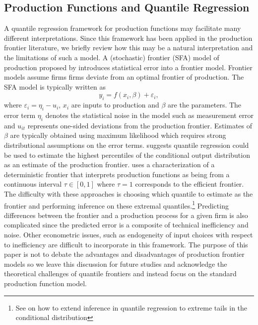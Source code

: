 \documentclass[11pt]{article}
\begin{document}
\subsection{Production Functions and Quantile Regression}


A quantile regression framework for production functions may facilitate many different interpretations. Since this framework has been applied in the production frontier literature, we briefly review how this may be a natural interpretation and the limitations of such a model. A (stochastic) frontier (SFA) model of production proposed by \cite{Aigner1977} introduces statistical error into a frontier model. Frontier models assume firms firms deviate from an optimal frontier of production. The SFA model is typically written as
\begin{equation}
y_{i}=f(x_{i}, \beta)+\varepsilon_{i},
\end{equation}
where $\varepsilon_{i}=\eta_{i}-u_{i}$, $x_{i}$ are inputs to production and $\beta$ are the parameters. The error term $\eta_{i}$ denotes the statistical noise in the model such as measurement error and $u_{it}$ represents one-sided deviations from the production frontier. Estimates of $\beta$ are typically obtained using maximum likelihood which requires strong distributional assumptions on the error terms. \cite{Bernini2004} suggests quantile regression could be used to estimate the highest percentiles of the conditional output distribution as an estimate of the production frontier. \cite{Aragon2005} uses a characterization of a deterministic frontier that interprets production functions as being from a continuous interval $\tau\in[0,1]$ where $\tau=1$ corresponds to the efficient frontier. The difficulty with these approaches is choosing which quantile to estimate as the frontier and performing inference on these extremal quantiles.\footnote{See \cite{Chernozhukov2005a} on how to extend inference in quantile regression to extreme tails in the conditional distribution} Predicting differences between the frontier and a production process for a given firm is also complicated since the predicted error is a composite of technical inefficiency and noise. Other econometric issues, such as endogeneity of input choices with respect to inefficiency are difficult to incorporate in this framework. The purpose of this paper is not to debate the advantages and disadvantages of production frontier models so we leave this discussion for future studies and acknowledge the theoretical challenges of quantile frontiers and instead focus on the standard production function model.
\end{document}
